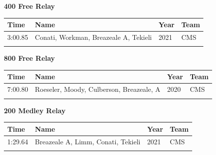 \noindent\begin{minipage}[t]{0.98\textwidth}
\centering
\textbf{\textcolor{teamprimary}{400 Free Relay}}\par
\vspace{0.5em}
\centering
\small
\renewcommand{\arraystretch}{1.0}
\setlength{\tabcolsep}{4pt}
\begin{tabular}{@{}p{2.7cm}p{4.3cm}p{1.6cm}p{2.7cm}@{}}
\toprule
\textbf{Time} & \textbf{Name} & \textbf{Year} & \textbf{Team} \\
\midrule
3:00.85 & Conati, Workman, Breazeale A, Tekieli & 2021 & CMS \\
\bottomrule
\vspace{0.5em}
\end{tabular}
\end{minipage}
\vspace{1.2em}
\noindent\begin{minipage}[t]{0.98\textwidth}
\centering
\textbf{\textcolor{teamprimary}{800 Free Relay}}\par
\vspace{0.5em}
\centering
\small
\renewcommand{\arraystretch}{1.0}
\setlength{\tabcolsep}{4pt}
\begin{tabular}{@{}p{2.7cm}p{4.3cm}p{1.6cm}p{2.7cm}@{}}
\toprule
\textbf{Time} & \textbf{Name} & \textbf{Year} & \textbf{Team} \\
\midrule
7:00.80 & Roeseler, Moody, Culberson, Breazeale, A & 2020 & CMS \\
\bottomrule
\vspace{0.5em}
\end{tabular}
\end{minipage}
\vspace{1.2em}
\noindent\begin{minipage}[t]{0.98\textwidth}
\centering
\textbf{\textcolor{teamprimary}{200 Medley Relay}}\par
\vspace{0.5em}
\centering
\small
\renewcommand{\arraystretch}{1.0}
\setlength{\tabcolsep}{4pt}
\begin{tabular}{@{}p{2.7cm}p{4.3cm}p{1.6cm}p{2.7cm}@{}}
\toprule
\textbf{Time} & \textbf{Name} & \textbf{Year} & \textbf{Team} \\
\midrule
1:29.64 & Breazeale A, Limm, Conati, Tekieli & 2021 & CMS \\
\bottomrule
\vspace{0.5em}
\end{tabular}
\end{minipage}
\vspace{1.2em}

